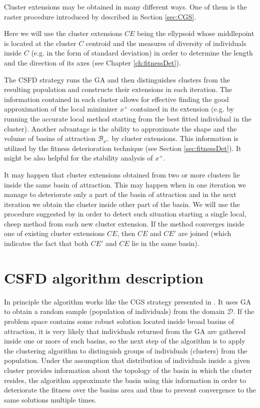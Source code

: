 Cluster extensions may be obtained in many different ways.
One of them is the raster procedure introduced by
\cite{Telega1999} described in Section \ref{sec:CGS}.

Here we will use the cluster extensions $CE$ being the ellypsoid
whose middlepoint is located at the cluster $C$ centroid
and the measures of diversity 
of individuals inside $C$ (e.g. in the form of standard deviation)
in order to determine the length and the direction of its axes
(see Chapter \ref{ch:fitnessDet}).

The CSFD strategy runs the GA and then distinguishes clusters from the resulting
population and constructs their extensions in each iteration.
The information contained in each cluster allows for 
effective finding the good approximation of the 
local minimizer $x^+$ contained in its extension
(e.g. by running the accurate local method starting from the best fitted
individual in the cluster).
Another advantage is the ability to approximate the shape and the volume of
basins of attraction $\mathcal{B}_{x^+}$ by cluster extensions.
This information is utilized by the fitness deterioration
technique (see Section \ref{sec:fitnessDet}). 
It might be also helpful for the stability analysis of $x^+$.



It may happen that cluster extensions obtained from two or more clusters
lie inside the same basin of attraction. This may happen when in one iteration
we manage to deteriorate only a part of the basin of attraction and in the next
iteration we obtain the cluster inside other part of the basin.  
We will use the procedure suggested by \cite{Telega1999} in order to detect
such situation starting a single local, cheep method from each new
cluster extension.
If the method converges inside one of existing cluster extensions $CE$,
then $CE$ and $CE'$ are joined
(which indicates the fact that both $CE'$ and $CE$ lie in
the same basin).

\section{CSFD algorithm description}
\label{sec:algDesc}

In principle the algorithm works like the CGS strategy  presented in 
\cite{SchaeferAdamskaTelega2004}. It uses GA to obtain
a random sample (population of individuals) from the domain $\mathcal{D}$.
If the problem space contains some robust solution located inside broad
basins of attraction, it is very likely that individuals returned from
the GA are gathered inside one or more of such basins, so the next step of the
algorithm is to apply the clustering algorithm to distinguish groups of
individuals (clusters) from the population. Under the assumption that
distribution of individuals inside a given cluster provides information
about the topology of the basin in which the cluster resides,
the algorithm approximate the basin using this information in order to 
deteriorate the fitness over the basins area
and thus to prevent convergence to the same solutions multiple times.

